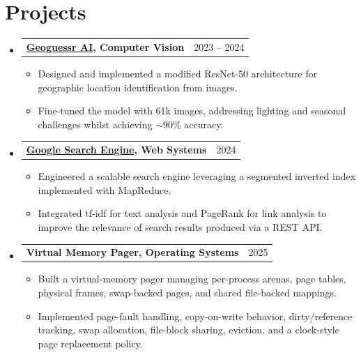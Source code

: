 \documentclass[letterpaper,11pt]{article}
\makeatletter
\newcommand{\resumeItem}[1]{
  \item\small{
    {#1 \vspace{-2pt}}
  }
}
\newcommand{\resumeProjectHeading}[2]{
    \item
    \begin{tabular*}{0.97\textwidth}{l@{\extracolsep{\fill}}r}
      \small#1 & #2 \\
    \end{tabular*}\vspace{-7pt}
}
\newcommand{\resumeSubHeadingListStart}{\begin{itemize}[leftmargin=0.15in, label={}]}
\newcommand{\resumeSubHeadingListEnd}{\end{itemize}}
\newcommand{\resumeItemListStart}{\begin{itemize}}
\newcommand{\resumeItemListEnd}{\end{itemize}\vspace{-5pt}}
\makeatother
\begin{document}
\section{Projects}
    \resumeSubHeadingListStart
        \resumeProjectHeading
            {\textbf{\href{https://aethom00.github.io/EECS_442_Final_Project.pdf}{\textbf{Geoguessr AI}}, Computer Vision}}{2023 -- 2024} %
            \resumeItemListStart
                \resumeItem{Designed and implemented a modified ResNet-50 architecture for geographic location identification from images.}
                \resumeItem{Fine-tuned the model with 61k images, addressing lighting and seasonal challenges whilst achieving $\sim$90\% accuracy.}
            \resumeItemListEnd
        \vspace{-14pt}
        \resumeProjectHeading
            {\textbf{\href{https://aethom00.github.io/485_p5}{Google Search Engine}, Web Systems}}{2024} %
            \resumeItemListStart
                \resumeItem{Engineered a scalable search engine leveraging a segmented inverted index implemented with MapReduce.}
                \resumeItem{Integrated tf-idf for text analysis and PageRank for link analysis to improve the relevance of search results produced via a REST API.}
            \resumeItemListEnd
        \vspace{-0.2em}
        \resumeProjectHeading
            {\textbf{Virtual Memory Pager, Operating Systems}}{2025}
            \resumeItemListStart
                \resumeItem{Built a virtual-memory pager managing per-process arenas, page tables, physical frames, swap-backed pages, and shared file-backed mappings.}
                \resumeItem{Implemented page-fault handling, copy-on-write behavior, dirty/reference tracking, swap allocation, file-block sharing, eviction, and a clock-style page replacement policy.}
            \resumeItemListEnd
    \resumeSubHeadingListEnd

\vspace{-1.2em}
\end{document}
